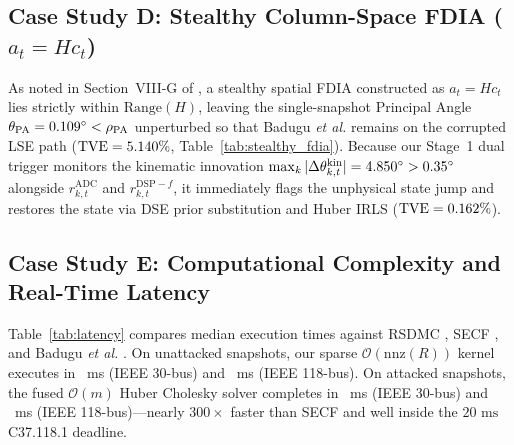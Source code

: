 \documentclass[journal,twoside]{IEEEtran}
\begin{document}
\begin{table}[!t]
\centering
\footnotesize
\caption{Per-Snapshot Execution Latency Comparison (Milliseconds)}
\label{tab:latency}
\end{table}

\subsection{Case Study D: Stealthy Column-Space FDIA ($a_t = H c_t$)}
As noted in Section~VIII-G of \cite{badugu2026synchrophasor}, a stealthy spatial FDIA constructed as $a_t = H c_t$ lies strictly within $\mathrm{Range}(H)$, leaving the single-snapshot Principal Angle $\theta_{\mathrm{PA}} = 0.109^\circ < \rho_{\mathrm{PA}}$ unperturbed so that Badugu \emph{et al.} remains on the corrupted LSE path ($\mathrm{TVE} = 5.140\%$, Table~\ref{tab:stealthy_fdia}). Because our Stage~1 dual trigger monitors the kinematic innovation $\max_k |\Delta\theta_{k,t}^{\mathrm{kin}}| = 4.850^\circ > 0.35^\circ$ alongside $r_{k,t}^{\mathrm{ADC}}$ and $r_{k,t}^{\mathrm{DSP}-f}$, it immediately flags the unphysical state jump and restores the state via DSE prior substitution and Huber IRLS ($\mathrm{TVE} = 0.162\%$).

\subsection{Case Study E: Computational Complexity and Real-Time Latency}
Table~\ref{tab:latency} compares median execution times against RSDMC \cite{chauhan2021synchrophasor}, SECF \cite{desilva2021pmu}, and Badugu \emph{et al.} \cite{badugu2026synchrophasor}. On unattacked snapshots, our sparse $\mathcal{O}(\mathrm{nnz}(R))$ kernel executes in \TimePropCleanThirty~ms (IEEE 30-bus) and \TimePropCleanOneEighteen~ms (IEEE 118-bus). On attacked snapshots, the fused $\mathcal{O}(m)$ Huber Cholesky solver completes in \TimePropAttackedThirty~ms (IEEE 30-bus) and \TimePropAttackedOneEighteen~ms (IEEE 118-bus)---nearly $300\times$ faster than SECF and well inside the $20\text{~ms}$ C37.118.1 deadline.
\end{document}

